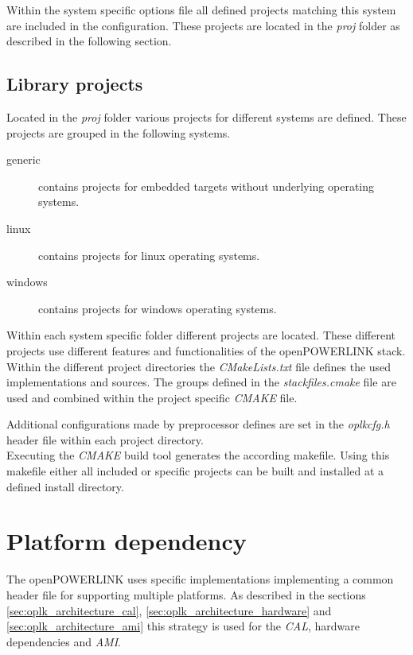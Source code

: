 Within the system specific options file all defined projects matching this system are included in the configuration.
These projects are located in the \emph{proj} folder as described in the following section.

\subsection{Library projects}
\label{sec:oplk_structure_proj}
Located in the \emph{proj} folder various projects for different systems are defined.
These projects are grouped in the following systems.

\begin{description}
    \item[generic] contains projects for embedded targets without underlying operating systems.
    \item[linux] contains projects for linux operating systems.
    \item[windows] contains projects for windows operating systems.
\end{description}

Within each system specific folder different projects are located.
These different projects use different features and functionalities of the openPOWERLINK stack.
Within the different project directories the \emph{CMakeLists.txt} file defines the used implementations and sources.
The groups defined in the \emph{stackfiles.cmake} file are used and combined within the project specific \emph{CMAKE} file.

Additional configurations made by preprocessor defines are set in the \emph{oplkcfg.h} header file within each project directory.
\\

Executing the \emph{CMAKE} build tool generates the according makefile.
Using this makefile either all included or specific projects can be built and installed at a defined install directory. \cite[Building Stack Libraries]{openpowerlink_doc}

\section{Platform dependency}
\label{sec:oplk_platform}

The openPOWERLINK uses specific implementations implementing a common header file for supporting multiple platforms.
As described in the sections \ref{sec:oplk_architecture_cal}, \ref{sec:oplk_architecture_hardware} and \ref{sec:oplk_architecture_ami} this strategy is used for the \emph{CAL}, hardware dependencies and \emph{AMI}.

